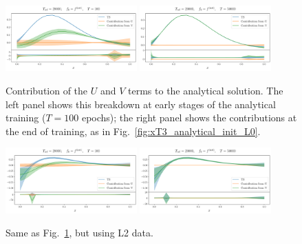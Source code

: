 \begin{figure}[ht!]
    \centering
    \includegraphics[width=0.45\textwidth]{plots/analytical_solution/pdf_plot_u_v_100_L0.pdf}
    \includegraphics[width=0.45\textwidth]{plots/analytical_solution/pdf_plot_u_v_50000_L0.pdf}
    \caption{Contribution of the $U$ and $V$ terms to the analytical solution. The left
    panel shows this breakdown at early stages of the analytical training
    ($T=100$ epochs); the right panel shows the contributions at the end of
    training, as in Fig.~\ref{fig:xT3_analytical_init_L0}.}
    \label{fig:xT3_u_v_contributions_L0}
  \end{figure}

  \begin{figure}[ht!]
    \centering
    \includegraphics[width=0.45\textwidth]{plots/analytical_solution/pdf_plot_u_v_100_L2.pdf}
    \includegraphics[width=0.45\textwidth]{plots/analytical_solution/pdf_plot_u_v_50000_L2.pdf}
    \caption{Same as Fig.~\ref{fig:xT3_u_v_contributions_L0}, but using L2 data.}
    \label{fig:xT3_u_v_contributions_L2}
  \end{figure}


\FloatBarrier
